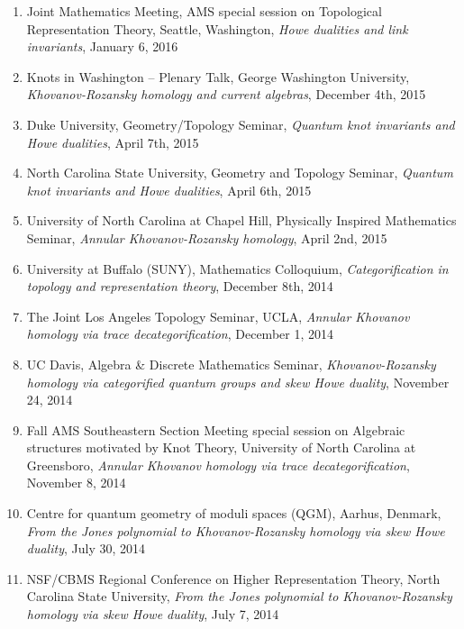 \documentclass[10pt]{article}
\begin{document}
\begin{enumerate}
\item Joint Mathematics Meeting, AMS special session on Topological Representation Theory, 
Seattle, Washington,
\emph{Howe dualities and link invariants},
January 6, 2016

\item Knots in Washington -- Plenary Talk, George Washington University,
\emph{Khovanov-Rozansky homology and current algebras},
December 4th, 2015

\item Duke University, Geometry/Topology Seminar, 
\emph{Quantum knot invariants and Howe dualities},
April 7th, 2015

\item North Carolina State University, Geometry and Topology Seminar, 
\emph{Quantum knot invariants and Howe dualities},
April 6th, 2015

\item University of North Carolina at Chapel Hill, Physically Inspired Mathematics Seminar, 
\emph{Annular Khovanov-Rozansky homology},
April 2nd, 2015

\item University at Buffalo (SUNY), Mathematics Colloquium, 
\emph{Categorification in topology and representation theory},
December 8th, 2014

\item The Joint Los Angeles Topology Seminar, UCLA, 
\emph{Annular Khovanov homology via trace decategorification},
December 1, 2014

\item UC Davis, Algebra \& Discrete Mathematics Seminar,
\emph{Khovanov-Rozansky homology via categorified quantum groups and skew Howe duality},
November 24, 2014

\item Fall AMS Southeastern Section Meeting special session on 
Algebraic structures motivated by Knot Theory, 
University of North Carolina at Greensboro, 
\emph{Annular Khovanov homology via trace decategorification},
November 8, 2014

\item Centre for quantum geometry of moduli spaces (QGM), Aarhus, Denmark,
\emph{From the Jones polynomial to Khovanov-Rozansky homology via skew Howe duality}, 
July 30, 2014

\item NSF/CBMS Regional Conference on Higher Representation Theory, 
North Carolina State University, 
\emph{From the Jones polynomial to Khovanov-Rozansky homology via skew Howe duality}, 
July 7, 2014


\end{enumerate}
\end{document}
